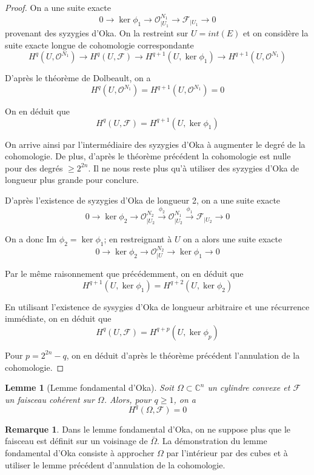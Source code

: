 \documentclass{article}
\newtheorem{lemme}[theoreme]{Lemme}
\theoremstyle{definition}
\theoremstyle{remarque}
\newtheorem{remarque}{Remarque}
\begin{document}
\begin{proof}
On a une suite exacte
$$0 \to \ker \phi_1 \to \mathcal{O}^{N_1}_{|U_1} \to \mathcal{F}_{|U_1} \to 0$$
provenant des syzygies d'Oka. On la restreint sur $U=int(E)$ et on considère la suite exacte longue de cohomologie correspondante
$$H^q(U, \mathcal{O}^{N_1}) \to H^q(U, \mathcal{F}) \to  H^{q+1}(U, \ker \phi_1) \to H^{q+1}(U, \mathcal{O}^{N_1})$$

D'après le théorème de Dolbeault, on a
$$H^q(U, \mathcal{O}^{N_1}) =  H^{q+1}(U, \mathcal{O}^{N_1}) = 0$$

On en déduit que $$H^q(U, \mathcal{F}) =  H^{q+1}(U, \ker \phi_1)$$

On arrive ainsi par l'intermédiaire des syzygies d'Oka à augmenter le degré de la cohomologie. De plus, d'après le théorème précédent la cohomologie est nulle pour des degrés $\geq 2^{2n}$. Il ne nous reste plus qu'à utiliser des syzygies d'Oka de longueur plus grande pour conclure.

D'après l'existence de syzygies d'Oka de longueur 2, on a une suite exacte
$$0 \to \ker \phi_2 \to \mathcal{O}^{N_2}_{|U_2} \overset{\phi_2}{\to} \mathcal{O}^{N_1}_{|U_2} \overset{\phi_1}{\to} \mathcal{F}_{|U_2} \to 0$$

On a donc Im $\phi_2 = \ker \phi_1$; en restreignant à $U$ on a alors une suite exacte
$$0 \to \ker \phi_2 \to \mathcal{O}^{N_2}_{|U} \to \ker \phi_1 \to 0$$

Par le même raisonnement que précédemment, on en déduit que
$$H^{q+1}(U, \ker \phi_1) =  H^{q+2}(U, \ker \phi_2)$$

En utilisant l'existence de sysygies d'Oka de longueur arbitraire et une récurrence immédiate, on en déduit que
$$H^q(U, \mathcal{F}) =  H^{q+p}(U, \ker \phi_p)$$

Pour $p = 2^{2n}-q$, on en déduit d'après le théorème précédent l'annulation de la cohomologie.
\end{proof}

\begin{lemme}[Lemme fondamental d'Oka]
Soit $\Omega \subset \mathbb{C}^n$ un cylindre convexe et $\mathcal{F}$ un faisceau cohérent sur $\Omega$. Alors, pour $q \geq 1$, on a
$$H^q(\Omega, \mathcal{F})=0$$
\end{lemme}

\begin{remarque}
Dans le lemme fondamental d'Oka, on ne suppose plus que le faisceau est définit sur un voisinage de $\bar{\Omega}$. La démonstration du lemme fondamental d'Oka consiste à approcher $\Omega$ par l'intérieur par des cubes et à utiliser le lemme précédent d'annulation de la cohomologie.
\end{remarque}
\end{document}
